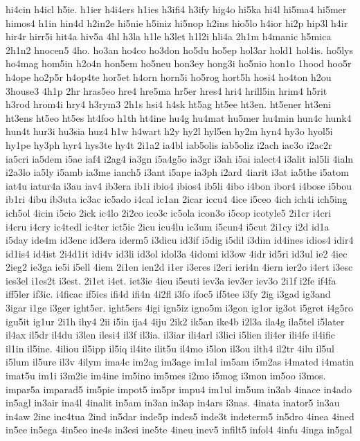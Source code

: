 {hi4cin
h4icl
h5ie.
h1ier
h4i4ers
h1ies
h3ifi4
h3ify
hig4o
hi5ka
hi4l
hi5ma4
hi5mer
himos4
h1in
hin4d
h2in2e
hi5nie
h5iniz
hi5nop
h2ins
hio5lo
h4ior
hi2p
hip3l
h4ir
hir4r
hirr5i
hit4a
hiv5a
4hl
h3la
h1le
h3let
h1l2i
hli4a
2h1m
h4manic
h5mica
2h1n2
hnocen5
4ho.
ho3an
ho4co
ho3don
ho5du
ho5ep
hol3ar
hold1
hol4is.
ho5lys
ho4mag
hom5in
h2o4n
hon5em
ho5neu
hon3ey
hong3i
ho5nio
hon1o
1hood
hoo5r
h4ope
ho2p5r
h4op4te
hor5et
h4orn
horn5i
ho5rog
hort5h
hosi4
ho4ton
h2ou
3house3
4h1p
2hr
hras5eo
hre4
hre5ma
hr5er
hres4
hri4
hrill5in
hrim4
h5rit
h3rod
hrom4i
hry4
h3rym3
2h1s
hsi4
h4sk
ht5ag
ht5ee
ht3en.
ht5ener
ht3eni
ht3ens
ht5eo
ht5es
ht4foo
h1th
ht4ine
hu4g
hu4mat
hu5mer
hu4min
hun4c
hunk4
hun4t
hur3i
hu3sia
huz4
h1w
h4wart
h2y
hy2l
hyl5en
hy2m
hyn4
hy3o
hyol5i
hy1pe
hy3ph
hyr4
hys3te
hy4t
2i1a2
ia4bl
iab5olis
iab5oliz
i2ach
iac3o
i2ac2r
ia5cri
ia5dem
i5ae
iaf4
i2ag4
ia3gn
i5a4g5o
ia3gr
i3ah
i5ai
ialect4
i3alit
ial5li
4ialn
i2a3lo
ia5ly
i5amb
ia3me
ianch5
i3ant
i5ape
ia3ph
i2ard
4iarit
i3at
ia5the
i5atom
iat4u
iatur4a
i3au
iav4
ib3era
ib1i
ibio4
ibios4
ib5li
4ibo
i4bon
ibor4
i4bose
i5bou
ib1ri
4ibu
ib3uta
ic3ac
ic5ado
i4cal
ic1an
2icar
iccu4
4ice
i5ceo
4ich
ich4i
ich5ing
ich5ol
4icin
i5cio
2ick
ic4lo
2i2co
ico3c
ic5ola
icon3o
i5cop
icotyle5
2i1cr
i4cri
i4cru
i4cry
ic4tedl
ic4ter
ict5ic
2icu
icu4lu
ic3um
i5cun4
i5cut
2i1cy
i2d
id1a
i5day
ide4m
id3enc
id3era
iderm5
i3dicu
id3if
i5dig
i5dil
i3dim
id4ines
idios4
idir4
id1is4
id4ist
2i4d1it
idi4v
id3li
id3ol
idol3a
4idomi
id3ow
4idr
id5ri
id3ul
ie2
4iec
2ieg2
ie3ga
ie5i
i5ell
4iem
2i1en
ien2d
i1er
i3eres
i2eri
ieri4n
4iern
ier2o
i4ert
i3esc
ies3el
i1es2t
i3est.
2i1et
i4et.
iet3ie
4ieu
i5euti
iev3a
iev3er
iev3o
2i1f
i2fe
if4fa
iff5ler
if3ic.
i4ficac
if5ics
ifi4d
ifi4n
4i2fl
i3fo
ifoc5
if5tee
i3fy
2ig
i3gad
ig3and
3igar
i1ge
i3ger
ight5er.
ight5ers
4igi
ign5iz
igno5m
i3gon
ig1or
ig3ot
i5gret
i4g5ro
igu5it
ig1ur
2i1h
ihy4
2ii
i5in
ija4
4iju
2ik2
ik5an
ike4b
i2l3a
ila4g
ila5tel
i5later
il4ax
il5dr
il4du
i3len
ilesi4
il3f
il3ia.
il3iar
ili4arl
i3lici
i5lien
ili4er
ili4fe
il4ific
il1in
il5ine.
4iliou
il5ipp
il5iq
il4ite
ilit5u
il4mo
i5lon
il3ou
ilth4
il2tr
4ilu
il5ul
i5lum
il5ure
il3v
4ilym
ima4c
im2ag
im3age
im1al
im5am
i5m2as
i4mated
i4matin
imat5u
im1i
i3m2ie
im4ine
im5ino
im5mes
i2mo
i5mog
i3mon
im5oo
i3mos.
impar5a
imparad5
im5pie
impot5
im5pr
impu4
im1ul
im5um
in3ab
4inace
in4ado
in5agl
in3air
ina4l
4inalit
in5am
in3an
in3ap
in4ars
i3nas.
4inata
inator5
in3au
in4aw
2inc
inc4tua
2ind
in5dar
inde5p
indes5
inde3t
indeterm5
in5dro
4inea
4ined
in5ee
in5ega
4in5eo
ine4s
in3esi
ine5te
4ineu
inev5
infilt5
infol4
4infu
4inga
in5gal
}
